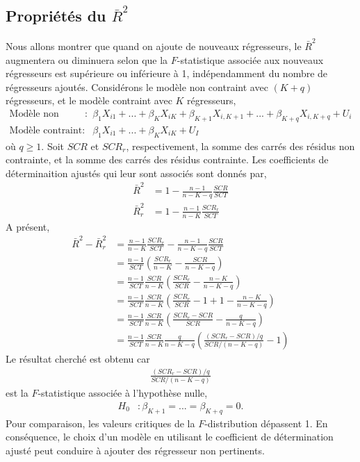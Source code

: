 \documentclass[10pt, reqno]{amsart}
\begin{document}
\subsection{Propriétés du $\bar{R}^2$}
Nous allons montrer que quand on  ajoute de nouveaux régresseurs, le $\bar{R}^2$ augmentera ou diminuera selon que la $F$-statistique associée aux nouveaux régresseurs est supérieure ou inférieure à 1, indépendamment du nombre de régresseurs ajoutés. Considérons le modèle non contraint avec $(K+q)$ régresseurs, et le modèle contraint avec $K$ régresseurs,
\begin{align*}
\textrm{Modèle non contraint}: & \beta_1X_{i1} + ...+\beta_KX_{iK} + \beta_{K+1}X_{i,K+1} +  ...+\beta_{K+q}X_{i,K+q} + U_i\\
\textrm{Modèle contraint}: &  \beta_1X_{i1} +...+\beta_KX_{iK} + U_I
\end{align*}
où $q\geq 1$. Soit $SCR$ et $SCR_r$, respectivement, la somme des carrés des résidus non contrainte, et la somme des carrés des résidus contrainte. Les coefficients de déterminaition ajustés qui leur sont associés sont donnés par,
\begin{align*}
\bar{R}^2 &= 1 - \frac{n-1}{n-K-q}\frac{SCR}{SCT}\\
\bar{R}^2_r &= 1 - \frac{n-1}{n-K}\frac{SCR_r}{SCT}
\end{align*}
A présent,
\begin{align*}
\bar{R}^2 - \bar{R}^2_r &= \frac{n-1}{n-K}\frac{SCR_r}{SCT} - \frac{n-1}{n-K-q}\frac{SCR}{SCT}\\
&= \frac{n-1}{SCT}\left(\frac{SCR_r}{n-K}- \frac{SCR}{n-K-q} \right)\\
&=\frac{n-1}{SCT}\frac{SCR}{n-K}\left(\frac{SCR_r}{SCR} - \frac{n-K}{n-K-q}\right)\\
&=\frac{n-1}{SCT}\frac{SCR}{n-K}\left(\frac{SCR_r}{SCR} -1+1- \frac{n-K}{n-K-q}\right)\\
&=\frac{n-1}{SCT}\frac{SCR}{n-K}\left(\frac{SCR_r - SCR}{SCR} - \frac{q}{n-K-q}\right)\\
&=\frac{n-1}{SCT}\frac{SCR}{n-K} \frac{q}{n-K-q}\left(\frac{(SCR_r - SCR)/q}{SCR/(n-K-q)} - 1\right)
\end{align*}
Le résultat cherché est obtenu car 
\begin{align*} 
\frac{(SCR_r - SCR)/q}{SCR/(n-K-q)}
\end{align*}
est la $F$-statistique associée à l'hypothèse nulle,
\begin{align*}
H_0&:\beta_{K+1}=...=\beta_{K+q}=0.
\end{align*}
Pour comparaison, les valeurs critiques de la $F$-distribution dépassent 1. En conséquence, le choix d'un  modèle en utilisant le coefficient de détermination ajusté peut conduire à ajouter des régresseur non pertinents.
\end{document}
